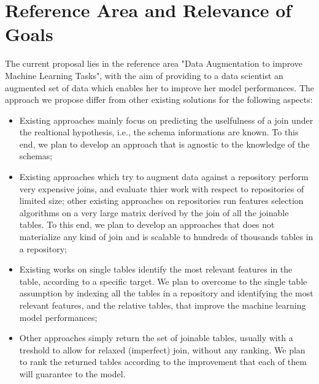 \section{Reference Area and Relevance of Goals}\label{reference}
The current proposal lies in the reference area "Data Augmentation to improve Machine Learning Tasks", with the aim of providing to a data scientist an augmented set of data which enables her to improve her model performances. The approach we propose differ from other existing solutions for the following aspects:
\begin{itemize}
    \item Existing approaches mainly focus on predicting the uselfulness of a join under the realtional hypothesis, i.e., the schema informations are known. To this end, we plan to develop an approach that is agnostic to the knowledge of the schemas;
    \item Existing approaches which try to augment data against a repository perform very expensive joins, and evaluate thier work with respect to repositories of limited size; other existing approaches on repositories run features selection algorithms on a very large matrix derived by the join of all the joinable tables. To this end, we plan to develop an approaches that does not materialize any kind of join and is scalable to hundreds of thousands tables in a repository;
    \item Existing works on single tables identify the most relevant features in the table, according to a specific target. We plan to overcome to the single table assumption by indexing all the tables in a repository and identifying the most relevant features, and the relative tables, that improve the machine learning model performances;
    \item Other approaches simply return the set of joinable tables, usually with a treshold to allow for relaxed  (imperfect) join, without any ranking. We plan to rank the returned tables according to the improvement that each of them will guarantee to the model.
\end{itemize}    